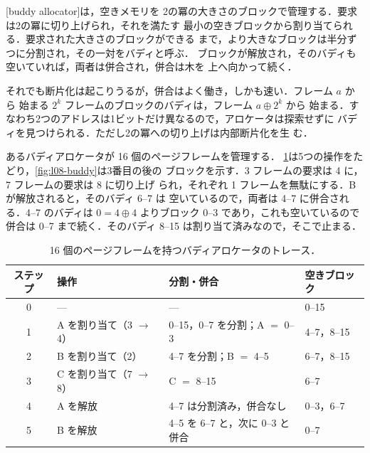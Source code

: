 \documentclass[../main.tex]{subfiles}
\begin{document}
\begin{definition}[バディアロケータ]
  [buddy allocator]は，空きメモリを
  2の冪の大きさのブロックで管理する．要求は2の冪に切り上げられ，それを満たす
  最小の空きブロックから割り当てられる．要求された大きさのブロックができる
  まで，より大きなブロックは半分ずつに分割され，その一対をバディと呼ぶ．
  ブロックが解放され，そのバディも空いていれば，両者は併合され，併合は木を
  上へ向かって続く．
\end{definition}

それでも断片化は起こりうるが，併合はよく働き，しかも速い．フレーム $a$ から
始まる $2^{k}$ フレームのブロックのバディは，フレーム $a \oplus 2^{k}$ から
始まる．すなわち2つのアドレスは1ビットだけ異なるので，アロケータは探索せずに
バディを見つけられる．ただし2の冪への切り上げは内部断片化を生
む．

\begin{example}
  \label{ex:l08-buddy}
  あるバディアロケータが 16 個のページフレームを管理する．
  \cref{tab:l08-buddy}は5つの操作をたどり，\cref{fig:l08-buddy}は3番目の後の
  ブロックを示す．3 フレームの要求は 4 に，7 フレームの要求は 8 に切り上げ
  られ，それぞれ 1 フレームを無駄にする．B が解放されると，そのバディ 6--7 は
  空いているので，両者は 4--7 に併合される．4--7 のバディは
  $0 = 4 \oplus 4$ よりブロック 0--3 であり，これも空いているので併合は 0--7
  まで続く．そのバディ 8--15 は割り当て済みなので，そこで止まる．
\end{example}

\begin{table}[htbp]
  \centering
  \caption{16 個のページフレームを持つバディアロケータのトレース．}
  \label{tab:l08-buddy}
  \small
  \begin{tabular}{@{}clll@{}}
    \toprule
    ステップ & 操作 & 分割・併合 & 空きブロック \\
    \midrule
    0 & ---                      & ---                                 & 0--15 \\
    1 & A を割り当て（3 $\to$ 4） & 0--15，0--7 を分割；A $=$ 0--3      & 4--7，8--15 \\
    2 & B を割り当て（2）        & 4--7 を分割；B $=$ 4--5             & 6--7，8--15 \\
    3 & C を割り当て（7 $\to$ 8） & C $=$ 8--15                        & 6--7 \\
    4 & A を解放                 & 4--7 は分割済み，併合なし         & 0--3，6--7 \\
    5 & B を解放                 & 4--5 を 6--7 と，次に 0--3 と併合   & 0--7 \\
    \bottomrule
  \end{tabular}
\end{table}
\end{document}
